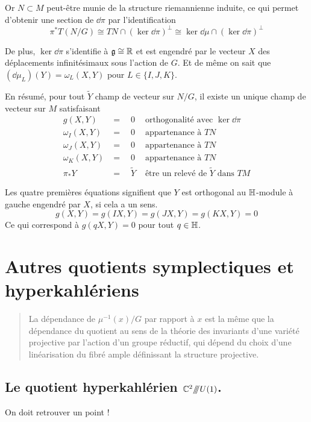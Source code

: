 \documentclass[a4paper,10pt]{article}
\begin{document}
Or $N \subset M$ peut-être munie de la structure riemannienne induite, ce qui permet d'obtenir une section de $\dd \pi$ par l'identification
\[
\pi^* T\left( N/G\right) \cong TN \cap \left(\ker \dd \pi\right)^\bot \cong \ker \dd \mu \cap \left(\ker \dd \pi\right)^\bot
\]

De plus, $\ker \dd \pi$ s'identifie à $\mathfrak{g} \cong \mathbb{R}$ et est engendré par le vecteur $X$ des déplacements infinitésimaux sous l'action de $G$. Et de même on sait que $(\dd \mu_L)(Y) = \omega_L(X,Y)$ pour $L \in \{I,J,K\}$.

En résumé, pour tout $\tilde{Y}$ champ de vecteur sur $N/G$, il existe un unique champ de vecteur sur $M$ satisfaisant
\begin{eqnarray*}
g(X,Y) & = \quad 0 & \text{ orthogonalité avec }\ker \dd \pi \\
\omega_I(X,Y) & = \quad 0 & \text{ appartenance à }TN \\
\omega_J(X,Y) & = \quad 0 & \text{ appartenance à }TN \\
\omega_K(X,Y) & = \quad 0 & \text{ appartenance à }TN \\
\pi_* Y & = \quad \tilde{Y} & \text{ être un relevé de }\tilde{Y} \text{ dans }TM
\end{eqnarray*}

Les quatre premières équations signifient que $Y$ est orthogonal au $\mathbb{H}$-module à gauche engendré par $X$, si cela a un sens.
\[
g(X,Y) = g(IX,Y)= g(JX,Y) = g(KX,Y) = 0
\]
Ce qui correspond à $g(qX,Y) = 0$ pour tout $q \in \mathbb{H}$.







\iffalse
\section{Autres quotients symplectiques et hyperkahlériens}

\begin{quote}
La dépendance de $\mu^{-1}(x)/G$ par rapport à $x$ est la même que la dépendance du quotient au sens de la théorie des invariants d'une variété projective par l'action d'un groupe réductif, qui dépend du choix d'une linéarisation du fibré ample définissant la structure projective.
\end{quote}

\subsection*{Le quotient hyperkahlérien $\mathbb{C}^2/\!\!/\!\!/U(1)$.} 
On doit retrouver un point !
\end{document}
